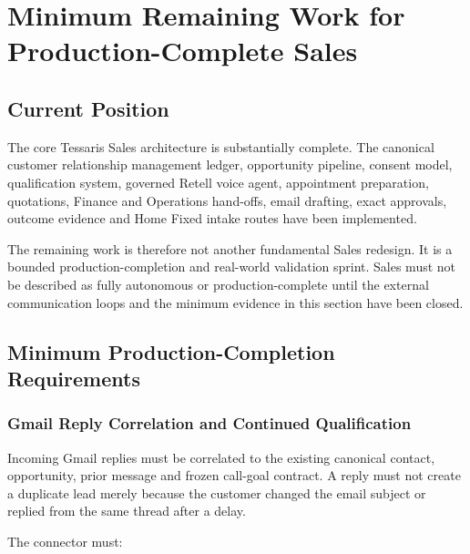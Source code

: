 
\section{Minimum Remaining Work for Production-Complete Sales}
\label{sec:tessaris-sales-minimum-remaining-work}

\subsection{Current Position}

The core Tessaris Sales architecture is substantially complete.  The canonical
customer relationship management ledger, opportunity pipeline, consent model,
qualification system, governed Retell voice agent, appointment preparation,
quotations, Finance and Operations hand-offs, email drafting, exact approvals,
outcome evidence and Home Fixed intake routes have been implemented.

The remaining work is therefore not another fundamental Sales redesign.  It is
a bounded production-completion and real-world validation sprint.  Sales must
not be described as fully autonomous or production-complete until the external
communication loops and the minimum evidence in this section have been closed.

\subsection{Minimum Production-Completion Requirements}

\subsubsection{Gmail Reply Correlation and Continued Qualification}

Incoming Gmail replies must be correlated to the existing canonical contact,
opportunity, prior message and frozen call-goal contract.  A reply must not
create a duplicate lead merely because the customer changed the email subject
or replied from the same thread after a delay.

The connector must:

